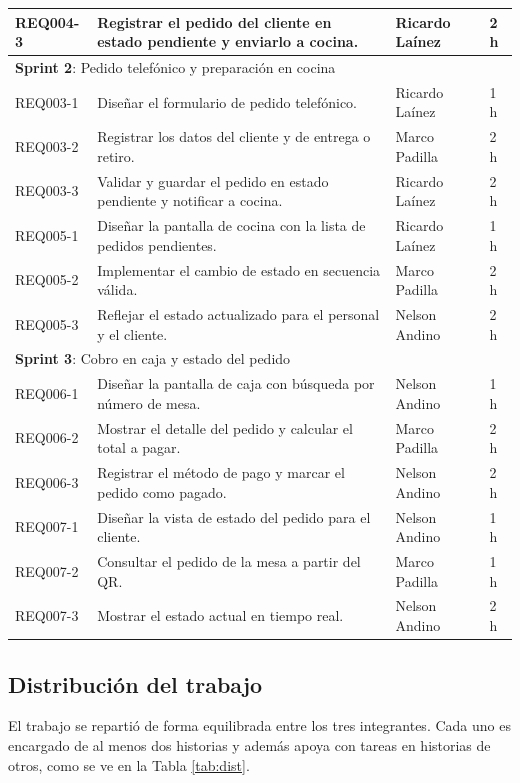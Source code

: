 \documentclass[a4paper, 11pt]{article}
\begin{document}
{\begin{longtable}{|p{1.9cm}|p{7.6cm}|p{2.6cm}|p{1.3cm}|}
REQ004-3 & Registrar el pedido del cliente en estado pendiente y enviarlo a cocina. & Ricardo Laínez & 2 h \\ \hline
\multicolumn{4}{|l|}{\textbf{Sprint 2}: Pedido telefónico y preparación en cocina} \\ \hline
REQ003-1 & Diseñar el formulario de pedido telefónico. & Ricardo Laínez & 1 h \\ \hline
REQ003-2 & Registrar los datos del cliente y de entrega o retiro. & Marco Padilla & 2 h \\ \hline
REQ003-3 & Validar y guardar el pedido en estado pendiente y notificar a cocina. & Ricardo Laínez & 2 h \\ \hline
REQ005-1 & Diseñar la pantalla de cocina con la lista de pedidos pendientes. & Ricardo Laínez & 1 h \\ \hline
REQ005-2 & Implementar el cambio de estado en secuencia válida. & Marco Padilla & 2 h \\ \hline
REQ005-3 & Reflejar el estado actualizado para el personal y el cliente. & Nelson Andino & 2 h \\ \hline
\multicolumn{4}{|l|}{\textbf{Sprint 3}: Cobro en caja y estado del pedido} \\ \hline
REQ006-1 & Diseñar la pantalla de caja con búsqueda por número de mesa. & Nelson Andino & 1 h \\ \hline
REQ006-2 & Mostrar el detalle del pedido y calcular el total a pagar. & Marco Padilla & 2 h \\ \hline
REQ006-3 & Registrar el método de pago y marcar el pedido como pagado. & Nelson Andino & 2 h \\ \hline
REQ007-1 & Diseñar la vista de estado del pedido para el cliente. & Nelson Andino & 1 h \\ \hline
REQ007-2 & Consultar el pedido de la mesa a partir del QR. & Marco Padilla & 1 h \\ \hline
REQ007-3 & Mostrar el estado actual en tiempo real. & Nelson Andino & 2 h \\ \hline

\end{longtable}
}

\subsection{Distribución del trabajo}

El trabajo se repartió de forma equilibrada entre los tres integrantes. Cada uno es encargado de al menos dos historias y además apoya con tareas en historias de otros, como se ve en la Tabla \ref{tab:dist}.
\end{document}
